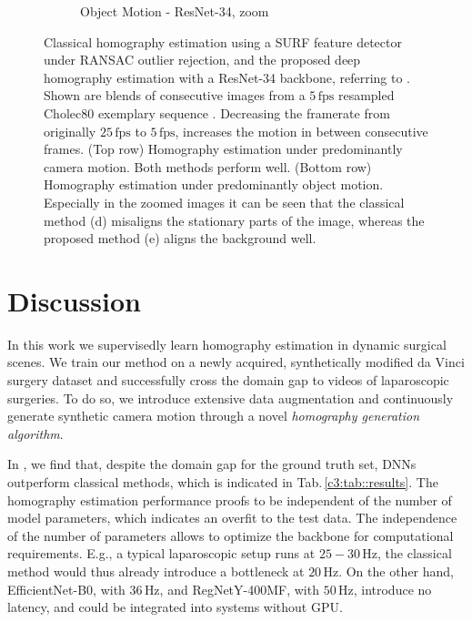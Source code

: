 \begin{landscape}
\begin{figure}
\begin{subfigure}[b]{0.5\textwidth}
    \caption{Object Motion - ResNet-34, zoom}
\end{subfigure}
\caption{Classical homography estimation using a SURF feature detector under RANSAC outlier rejection, and the proposed deep homography estimation with a ResNet-34 backbone, referring to . Shown are blends of consecutive images from a $5\,\text{fps}$ resampled Cholec80 exemplary sequence \cite{twinanda2016endonet}. Decreasing the framerate from originally $25\,\text{fps}$ to $5\,\text{fps}$, increases the motion in between consecutive frames. (Top row) Homography estimation under predominantly camera motion. Both methods perform well. (Bottom row) Homography estimation under predominantly object motion. Especially in the zoomed images it can be seen that the classical method (d) misaligns the stationary parts of the image, whereas the proposed method (e) aligns the background well.}
\label{c3:fig:qualitative}
\end{figure}
\end{landscape}



\section{Discussion}

In this work we supervisedly learn homography estimation in dynamic surgical scenes. We train our method on a newly acquired, synthetically modified da Vinci surgery dataset and successfully cross the domain gap to videos of laparoscopic surgeries. To do so, we introduce extensive data augmentation and continuously generate synthetic camera motion through a novel \textit{homography generation algorithm}.

In , we find that, despite the domain gap for the ground truth set, DNNs outperform classical methods, which is indicated in Tab.\,\ref{c3:tab::results}. The homography estimation performance proofs to be independent of the number of model parameters, which indicates an overfit to the test data. The independence of the number of parameters allows to optimize the backbone for computational requirements. E.g., a typical laparoscopic setup runs at $25-30\,\text{Hz}$, the classical method would thus already introduce a bottleneck at $20\,\text{Hz}$. On the other hand, EfficientNet-B0, with $36\,\text{Hz}$, and RegNetY-400MF, with $50\,\text{Hz}$, introduce no latency, and could be integrated into systems without GPU.

